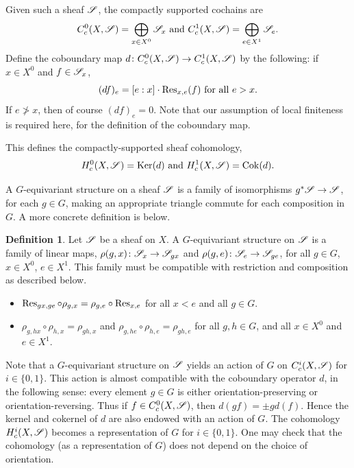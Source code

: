 \documentclass[letter]{amsart}
\theoremstyle{definition}
\newtheorem{definition}[thm]{Definition}
\theoremstyle{remark}
\numberwithin{thm}{section}
\numberwithin{equation}{section}
\begin{document}
Given such a sheaf ${\mathscr{S}}$, the compactly supported cochains are
$$C_c^0(X, {\mathscr{S}}) = \bigoplus_{x \in X^0} {\mathscr{S}}_x \text{ and } C_c^1(X, {\mathscr{S}}) = \bigoplus_{e \in X^1} {\mathscr{S}}_e.$$
Define the coboundary map $d \colon C_c^0(X, {\mathscr{S}}) \rightarrow C_c^1(X, {\mathscr{S}})$ by the following:  if $x \in X^0$ and $f \in {\mathscr{S}}_x$,
$$(df)_e = [e:x] \cdot \operatorname{Res}_{x,e}(f) \text{ for all } e > x.$$
If $e \not > x$, then of course $(df)_e = 0$.  Note that our assumption of local finiteness is required here, for the definition of the coboundary map.

This defines the compactly-supported sheaf cohomology,
$$H_c^0(X, {\mathscr{S}}) = \operatorname{Ker}(d) \text{ and } H_c^1(X, {\mathscr{S}}) = \operatorname{Cok}(d).$$

A $G$-equivariant structure on a sheaf ${\mathscr{S}}$ is a family of isomorphisms $g^\ast {\mathscr{S}} \rightarrow {\mathscr{S}}$, for each $g \in G$, making an appropriate triangle commute for each composition in $G$.  A more concrete definition is below.
\begin{definition}
Let ${\mathscr{S}}$ be a sheaf on $X$.  A $G$-equivariant structure on ${\mathscr{S}}$ is a family of linear maps, $\rho(g,x) \colon {\mathscr{S}}_x \rightarrow {\mathscr{S}}_{gx}$ and $\rho(g,e) \colon {\mathscr{S}}_e \rightarrow {\mathscr{S}}_{ge}$, for all $g \in G$, $x \in X^0$, $e \in X^1$.  This family must be compatible with restriction and composition as described below.
\begin{itemize}
\item
$\operatorname{Res}_{gx, ge} \circ \rho_{g,x}  = \rho_{g,e} \circ \operatorname{Res}_{x,e}$ for all $x < e$ and all $g \in G$.
\item
$\rho_{g,hx} \circ \rho_{h,x} = \rho_{gh,x}$ and $\rho_{g,he} \circ \rho_{h,e} = \rho_{gh,e}$ for all $g,h \in G$, and all $x \in X^0$ and $e \in X^1$.
\end{itemize}
\end{definition}

Note that a $G$-equivariant structure on ${\mathscr{S}}$ yields an action of $G$ on $C_c^i(X, {\mathscr{S}})$ for $i \in \{ 0, 1 \}$.  This action is almost compatible with the coboundary operator $d$, in the following sense:  every element $g \in G$ is either orientation-preserving or orientation-reversing.  Thus if $f \in C_c^0(X, {\mathscr{S}})$, then $d(g f) = \pm g d(f)$.  Hence the kernel and cokernel of $d$ are also endowed with an action of $G$.  The cohomology $H_c^i(X, {\mathscr{S}})$ becomes a representation of $G$ for $i \in \{ 0, 1 \}$.  One may check that the cohomology (as a representation of $G$) does not depend on the choice of orientation.  
\end{document}
